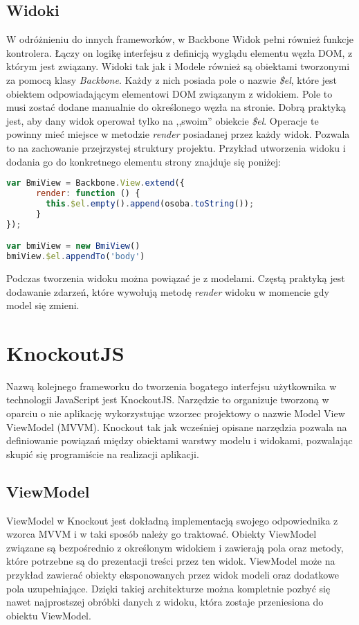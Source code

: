 \subsection{Widoki}
W odróżnieniu do innych frameworków, w Backbone Widok pełni również funkcje kontrolera. Łączy on logikę interfejsu z definicją wyglądu elementu węzła DOM, z którym jest związany. Widoki tak jak i Modele również są obiektami tworzonymi za pomocą klasy \textit{Backbone}. Każdy z nich posiada pole o nazwie \textit{\$el}, które jest obiektem odpowiadającym elementowi DOM związanym z widokiem. Pole to musi zostać dodane manualnie do określonego węzła na stronie. Dobrą praktyką jest, aby dany widok operował tylko na ,,swoim'' obiekcie \textit{\$el}. Operacje te powinny mieć miejsce w metodzie \textit{render} posiadanej przez każdy widok. Pozwala to na zachowanie przejrzystej struktury projektu. Przykład utworzenia widoku i dodania go do konkretnego elementu strony znajduje się poniżej:

\begin{lstlisting}[language=JavaScript]
var BmiView = Backbone.View.extend({ 
	  render: function () {
	  	this.$el.empty().append(osoba.toString());
  	  }
});

var bmiView = new BmiView()
bmiView.$el.appendTo('body')
\end{lstlisting}

Podczas tworzenia widoku można powiązać je z modelami. Częstą praktyką jest dodawanie zdarzeń, które wywołują metodę \textit{render} widoku w momencie gdy model się zmieni.



\section{KnockoutJS}
Nazwą kolejnego frameworku do tworzenia bogatego interfejsu użytkownika w technologii JavaScript jest KnockoutJS. Narzędzie to organizuje tworzoną w oparciu o nie aplikację wykorzystując wzorzec projektowy o nazwie Model View ViewModel (MVVM)\cite{knockout-doc}. Knockout tak jak wcześniej opisane narzędzia pozwala na definiowanie powiązań między obiektami warstwy modelu i widokami, pozwalając skupić się programiście na realizacji aplikacji.


\subsection{ViewModel}
ViewModel w Knockout jest dokładną implementacją swojego odpowiednika z wzorca MVVM i w taki sposób należy go traktować. Obiekty ViewModel związane są bezpośrednio z określonym widokiem i zawierają pola oraz metody, które potrzebne są do prezentacji treści przez ten widok. ViewModel może na przykład zawierać obiekty eksponowanych przez widok modeli oraz dodatkowe pola uzupełniające. Dzięki takiej architekturze można kompletnie pozbyć się nawet najprostszej obróbki danych z widoku, która zostaje przeniesiona do obiektu ViewModel.

